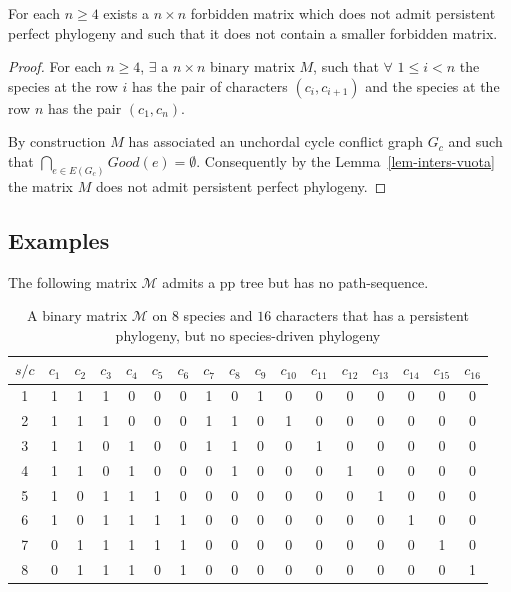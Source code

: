 \begin{theorem}
  \label{teo_esistenza_PM}
  For each $n \ge 4$ exists a $n \times n$ forbidden matrix which does not
admit persistent perfect phylogeny and such
  that it does not contain a smaller forbidden matrix.
\end{theorem}
\begin{proof}
  For each $n\ge 4$, $\exists$ a $n \times n$ binary matrix $M$, such that
$\forall$ $1 \le i < n$ the species at the row $i$ has the pair of characters
$(c_i, c_{i+1})$ and the species at the row $n$ has the pair $(c_1, c_n)$.

  By construction $M$ has associated an unchordal cycle conflict graph $G_c$
and such that $\bigcap_{e \in E(G_c)} Good(e) = \emptyset$. Consequently by the
Lemma~\ref{lem-inters-vuota} the matrix $M$ does not admit persistent perfect
phylogeny.

\end{proof}




\subsection*{Examples}

The following matrix $\mathcal M$ admits a pp tree but has no path-sequence.

\begin{table}
\centering
\begin{tabular}{c|cccccccccccccccc}
    $s/c$ & $c_1$ & $c_2$ & $c_3$ & $c_4$ & $c_5$ & $c_6$ & $c_7$ & $c_8$ & $c_9$ & $c_{10}$ &
$c_{11}$ & $c_{12}$ & $c_{13}$ & $c_{14}$ & $c_{15}$ & $c_{16}$\\\hline
1 & 1 & 1 & 1 & 0 & 0 & 0 & 1 & 0 & 1 & 0 & 0 & 0 & 0 & 0 & 0 & 0 \\
2 & 1 & 1 & 1 & 0 & 0 & 0 & 1 & 1 & 0 & 1 & 0 & 0 & 0 & 0 & 0 & 0 \\
3 & 1 & 1 & 0 & 1 & 0 & 0 & 1 & 1 & 0 & 0 & 1 & 0 & 0 & 0 & 0 & 0 \\
4 & 1 & 1 & 0 & 1 & 0 & 0 & 0 & 1 & 0 & 0 & 0 & 1 & 0 & 0 & 0 & 0 \\
5 & 1 & 0 & 1 & 1 & 1 & 0 & 0 & 0 & 0 & 0 & 0 & 0 & 1 & 0 & 0 & 0 \\
6 & 1 & 0 & 1 & 1 & 1 & 1 & 0 & 0 & 0 & 0 & 0 & 0 & 0 & 1 & 0 & 0 \\
7 & 0 & 1 & 1 & 1 & 1 & 1 & 0 & 0 & 0 & 0 & 0 & 0 & 0 & 0 & 1 & 0 \\
8 & 0 & 1 & 1 & 1 & 0 & 1 & 0 & 0 & 0 & 0 & 0 & 0 & 0 & 0 & 0 & 1 \\
\end{tabular}
\caption{A binary matrix  $\mathcal M$ on $8$ species and $16$
  characters that has a persistent phylogeny, but no species-driven phylogeny}
\label{table:matAmmetteP-pp}
\end{table}



